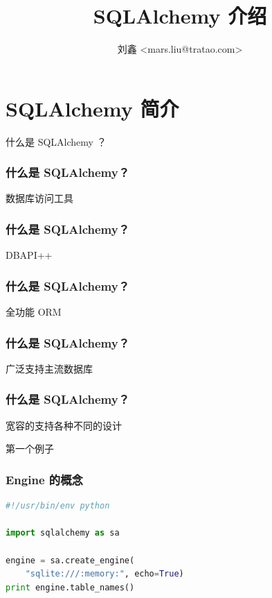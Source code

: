 \documentclass{beamer}
\title{SQLAlchemy 介绍}
\author[刘鑫]{刘鑫 <mars.liu@tratao.com>}
\institute{Python 最好的数据库访问工具}
\begin{document}
\frame{\titlepage}

\section{SQLAlchemy 简介}

\begin{frame}
  \begin{center}
    \Huge{什么是 SQLAlchemy ？}
  \end{center}
\end{frame}

\begin{frame}
  \frametitle{什么是 SQLAlchemy？}
  \begin{center}
    \huge{数据库访问工具}
  \end{center}
\end{frame}

\begin{frame}
  \frametitle{什么是 SQLAlchemy？}
  \begin{center}
    \huge{DBAPI++}
  \end{center}
\end{frame}

\begin{frame}
  \frametitle{什么是 SQLAlchemy？}
  \begin{center}
    \huge{全功能 ORM}
  \end{center}
\end{frame}

\begin{frame}
  \frametitle{什么是 SQLAlchemy？}
  \begin{center}
    \huge{广泛支持主流数据库}
  \end{center}
\end{frame}


\begin{frame}
  \frametitle{什么是 SQLAlchemy？}
  \begin{center}
    \huge{宽容的支持各种不同的设计}
  \end{center}
\end{frame}

\begin{frame}
  \begin{center}
    \Huge{第一个例子}
  \end{center}
\end{frame}

\begin{frame}[containsverbatim]
  \frametitle{Engine 的概念}
  \begin{lstlisting}[language=python]
#!/usr/bin/env python

import sqlalchemy as sa

engine = sa.create_engine(
    "sqlite:///:memory:", echo=True)
print engine.table_names()
  \end{lstlisting}
\end{frame}
\end{document}
